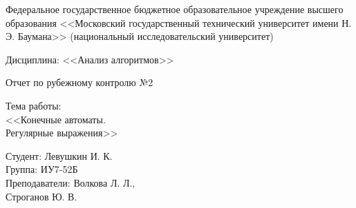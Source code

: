 \documentclass[a4paper,12pt]{article}
\begin{document}

\large
\begin{center}
	Федеральное государственное бюджетное образовательное учреждение 
	высшего образования <<Московский государственный технический 
	университет имени Н. Э. Баумана>> 
	(национальный исследовательский университет)
\end{center}

\vspace*{30mm} 

\huge
\begin{center}
	Дисциплина: <<Анализ алгоритмов>>
	
	Отчет по рубежному контролю №2
\end{center}

\vspace*{30mm} 

\huge
\begin{center}
	Тема работы:\\
	<<Конечные автоматы.\\ Регулярные выражения>>
\end{center}
\vspace*{30mm} 

\large
\begin{flushright}
	Студент: Левушкин И. К. \\
	Группа: ИУ7-52Б \\
	Преподаватели: Волкова Л. Л., \\ Строганов Ю. В. \\
\end{flushright}
\end{document}
